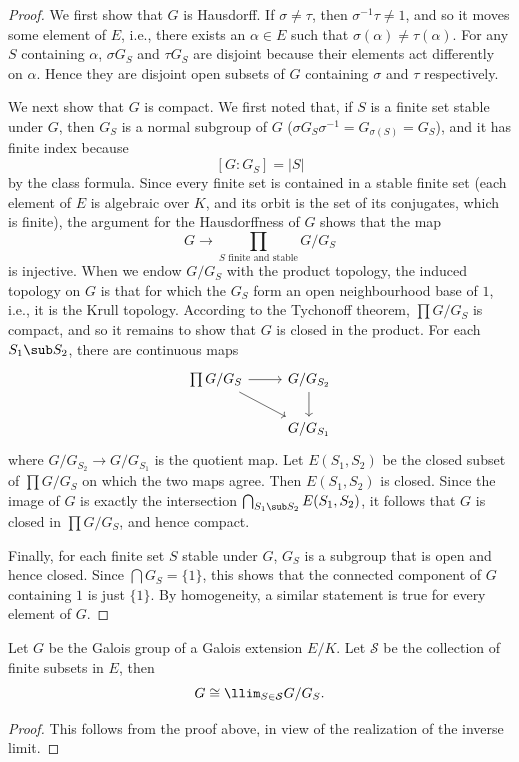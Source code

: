 \begin{proof}
We first show that $G$ is Hausdorff. If $\sigma\neq\tau$, then $\sigma^{-1}\tau\neq 1$, and so it moves some element of $E$, i.e., there exists an $\alpha\in E$ such that $\sigma(\alpha)\neq\tau(\alpha)$. For any $S$ containing $\alpha$, $\sigma G_S$ and $\tau G_S$ are disjoint because their elements act differently on $\alpha$. Hence they are disjoint open subsets of $G$ containing $\sigma$ and $\tau$ respectively.\par
We next show that $G$ is compact. We first noted that, if $S$ is a finite set stable under $G$, then $G_S$ is a normal subgroup of $G$ ($\sigma G_S\sigma^{-1}=G_{\sigma(S)}=G_S$), and it has finite index because
\[[G:G_S]=|S|\]
by the class formula. Since every finite set is contained in a stable finite set (each element of $E$ is algebraic over $K$, and its orbit is the set of its conjugates, which is finite), the argument for the Hausdorffness of $G$ shows that the map
\[G\to\prod_{\text{$S$ finite and stable}}G/G_S\]
is injective. When we endow $G/G_S$ with the product topology, the induced topology on $G$ is that for which the $G_S$ form an open neighbourhood base of $1$, i.e., it is the Krull topology. According to the Tychonoff theorem, $\prod G/G_S$ is compact, and so it remains to show that $G$ is closed in the product. For each $S_1\sub S_2$, there are continuous
maps
\[\begin{tikzcd}
\prod G/G_S\ar[r]\ar[rd]&G/G_{S_2}\ar[d]\\
&G/G_{S_1}
\end{tikzcd}\]
where $G/G_{S_2}\to G/G_{S_1}$ is the quotient map. Let $E(S_1,S_2)$ be the closed subset of $\prod G/G_S$ on which the two maps agree. Then $E(S_1,S_2)$ is closed. Since the image of $G$ is exactly the intersection $\bigcap_{S_1\sub S_2}E(S_1,S_2)$, it follows that $G$ is closed in $\prod G/G_S$, and hence compact.\par
Finally, for each finite set $S$ stable under $G$, $G_S$ is a subgroup that is open and hence closed. Since $\bigcap G_S=\{1\}$, this shows that the connected component of $G$ containing $1$ is just $\{1\}$. By homogeneity, a similar statement is true for every element of $G$.
\end{proof}
\begin{corollary}\label{Galois group identified as inverse limit}
Let $G$ be the Galois group of a Galois extension $E/K$. Let $\mathcal{S}$ be the collection of finite subsets in $E$, then
\[G\cong\llim_{S\in\mathcal{S}} G/G_S.\]
\end{corollary}
\begin{proof}
This follows from the proof above, in view of the realization of the inverse limit.
\end{proof}
